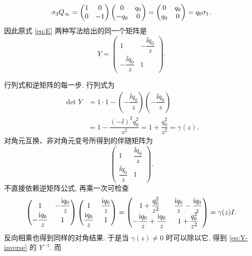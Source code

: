 \begin{equation*}
\sigma_3 Q_\infty
=\begin{pmatrix}1&0\\0&-1\end{pmatrix}
\begin{pmatrix}0&q_0\\-q_0&0\end{pmatrix}
=\begin{pmatrix}0&q_0\\q_0&0\end{pmatrix}
=q_0\sigma_1.
\end{equation*}
因此原式 \eqref{eq:E} 两种写法给出的同一个矩阵是
\begin{equation*}
Y=\begin{pmatrix}1&-\dfrac{\ii q_0}{z}\\-\dfrac{\ii q_0}{z}&1\end{pmatrix}.
\end{equation*}
\par\smallskip\noindent 行列式和逆矩阵的每一步.\quad
行列式为
\begin{align*}
\det Y
&=1\cdot1-\left(-\dfrac{\ii q_0}{z}\right)
\left(-\dfrac{\ii q_0}{z}\right)\\
&=1-\dfrac{(-\ii)^2q_0^2}{z^2}
=1+\dfrac{q_0^2}{z^2}=\gamma(z).
\end{align*}
对角元互换、非对角元变号所得到的伴随矩阵为
\begin{equation*}
\begin{pmatrix}1&\dfrac{\ii q_0}{z}\\\dfrac{\ii q_0}{z}&1\end{pmatrix}.
\end{equation*}
不直接依赖逆矩阵公式, 再乘一次可检查
\begin{equation*}
\begin{pmatrix}1&-\dfrac{\mathrm{i} q_0}{z}\\-\dfrac{\mathrm{i} q_0}{z}&1\end{pmatrix}
\begin{pmatrix}1&\dfrac{\mathrm{i} q_0}{z}\\\dfrac{\mathrm{i} q_0}{z}&1\end{pmatrix}
=\begin{pmatrix}
1+\dfrac{q_0^2}{z^2}&\dfrac{\mathrm{i} q_0}{z}-\dfrac{\mathrm{i} q_0}{z}\\
-\dfrac{\mathrm{i} q_0}{z}+\dfrac{\mathrm{i} q_0}{z}&1+\dfrac{q_0^2}{z^2}
\end{pmatrix}
=\gamma(z)I.
\end{equation*}
反向相乘也得到同样的对角结果. 于是当 $\gamma(z)\ne0$ 时可以除以它, 得到 \eqref{eq:Y-inverse} 的 $Y^{-1}$. 而
